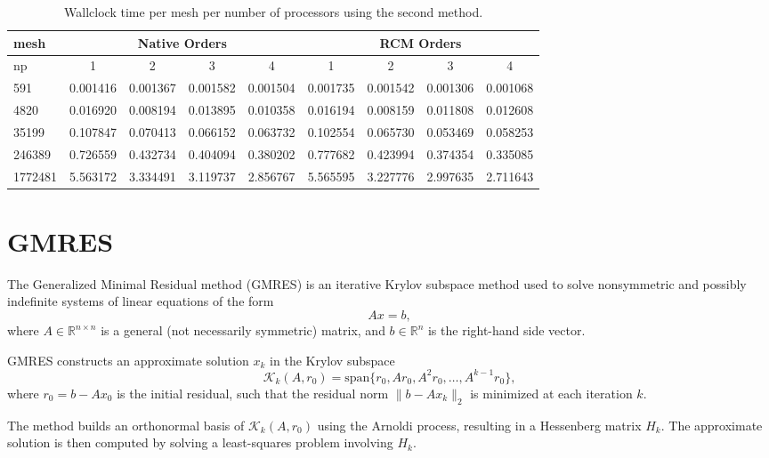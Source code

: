 \documentclass[hidelinks]{article}
\begin{document}
\begin{table}[H]
    \centering

    \begin{tabular}{|l|cccc|cccc|}
        \hline
        mesh     & \multicolumn{4}{c|}{Native Orders}           & \multicolumn{4}{c|}{RCM Orders}   \\ \hline
        np       & 1 & 2 & 3 & 4                                & 1        & 2        & 3        & 4                     \\ \hline
        591      & 0.001416 & 0.001367 & 0.001582 & 0.001504    & 0.001735 & 0.001542 & 0.001306 & 0.001068              \\
        4820     & 0.016920 & 0.008194 & 0.013895 & 0.010358    & 0.016194 & 0.008159 & 0.011808 & 0.012608              \\
        35199    & 0.107847 & 0.070413 & 0.066152 & 0.063732    & 0.102554 & 0.065730 & 0.053469 & 0.058253              \\
        246389   & 0.726559 & 0.432734 & 0.404094 & 0.380202    & 0.777682 & 0.423994 & 0.374354 & 0.335085              \\
        1772481  & 5.563172 & 3.334491 & 3.119737 & 2.856767    & 5.565595 & 3.227776 & 2.997635 & 2.711643              \\ \hline
    \end{tabular}
    \caption{Wallclock time per mesh per number of processors using the second method.}\label{tab:second}
\end{table}

\section{GMRES}

The Generalized Minimal Residual method (GMRES) is an iterative Krylov subspace method used to solve nonsymmetric and possibly indefinite systems of linear equations of the form
\[
Ax = b,
\]
where \( A \in \mathbb{R}^{n \times n} \) is a general (not necessarily symmetric) matrix, and \( b \in \mathbb{R}^n \) is the right-hand side vector.

GMRES constructs an approximate solution \( x_k \) in the Krylov subspace
\[
\mathcal{K}_k(A, r_0) = \text{span} \{ r_0, Ar_0, A^2r_0, \dots, A^{k-1}r_0 \},
\]
where \( r_0 = b - Ax_0 \) is the initial residual, such that the residual norm \( \| b - Ax_k \|_2 \) is minimized at each iteration \( k \).

The method builds an orthonormal basis of \( \mathcal{K}_k(A, r_0) \) using the Arnoldi process, resulting in a Hessenberg matrix \( H_k \). The approximate solution is then computed by solving a least-squares problem involving \( H_k \).
\end{document}

